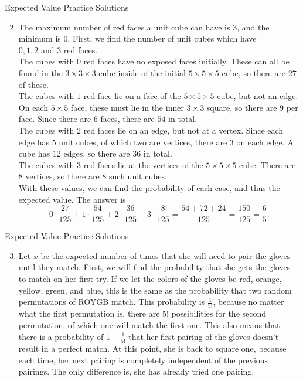 \documentclass[9pt]{beamer}
\begin{document}
\begin{frame}[t]{Expected Value Practice Solutions}
    \begin{enumerate}
    \setcounter{enumi}{1}
        \item The maximum number of red faces a unit cube can have is $3$, and the minimum is $0$. First, we find the number of unit cubes which have $0,1,2\text{ and } 3$ red faces.\\
        \bigskip
        The cubes with $0$ red faces have no exposed faces initially. These can all be found in the $3\times3\times3$ cube inside of the initial $5\times5\times5$ cube, so there are $27$ of these.\\
        The cubes with $1$ red face lie on a face of the $5\times5\times5$ cube, but not an edge. On each $5\times 5$ face, these must lie in the inner $3\times 3$ square, so there are $9$ per face. Since there are $6$ faces, there are $54$ in total.\\
        The cubes with $2$ red faces lie on an edge, but not at a vertex. Since each edge has $5$ unit cubes, of which two are vertices, there are $3$ on each edge. A cube has $12$ edges, so there are $36$ in total.\\
        The cubes with $3$ red faces lie at the vertices of the $5\times5\times5$ cube. There are $8$ vertices, so there are $8$ such unit cubes. \\
        \bigskip
        With these values, we can find the probability of each case, and thus the expected value. The answer is
        $$0\cdot\frac{27}{125}+1\cdot\frac{54}{125}+2\cdot\frac{36}{125}+3\cdot\frac{8}{125}=\frac{54+72+24}{125}=\frac{150}{125}=\frac{6}{5}.$$
    \end{enumerate}
    
\end{frame}






\begin{frame}[t]{Expected Value Practice Solutions}
    \begin{enumerate}
    \setcounter{enumi}{2}
        \item Let $x$ be the expected number of times that she will need to pair the gloves until they match. First, we will find the probability that she gets the gloves to match on her first try. If we let the colors of the gloves be red, orange, yellow, green, and blue, this is the same as the probability that two random permutations of ROYGB match. This probability is $\frac{1}{5!}$, because no matter what the first permutation is, there are $5!$ possibilities for the second permutation, of which one will match the first one. This also means that there is a probability of $1-\frac{1}{5!}$ that her first pairing of the gloves doesn't result in a perfect match. At this point, she is back to square one, because each time, her next pairing is completely independent of the previous pairings. The only difference is, she has already tried one pairing. 
    \end{enumerate}
    
\end{frame}
\end{document}
